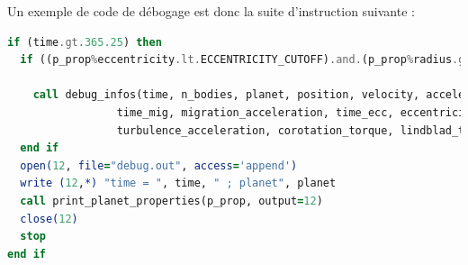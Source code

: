 Un exemple de code de débogage est donc la suite d'instruction suivante :
\begin{lstlisting}[language=Fortran]
if (time.gt.365.25) then
  if ((p_prop%eccentricity.lt.ECCENTRICITY_CUTOFF).and.(p_prop%radius.gt.INNER_BOUNDARY_RADIUS)) then
  
    call debug_infos(time, n_bodies, planet, position, velocity, acceleration, &
                 time_mig, migration_acceleration, time_ecc, eccentricity_acceleration, &
                 turbulence_acceleration, corotation_torque, lindblad_torque, torque_ref, ecc_corot)
  end if
  open(12, file="debug.out", access='append')
  write (12,*) "time = ", time, " ; planet", planet
  call print_planet_properties(p_prop, output=12)
  close(12)
  stop
end if
\end{lstlisting}
